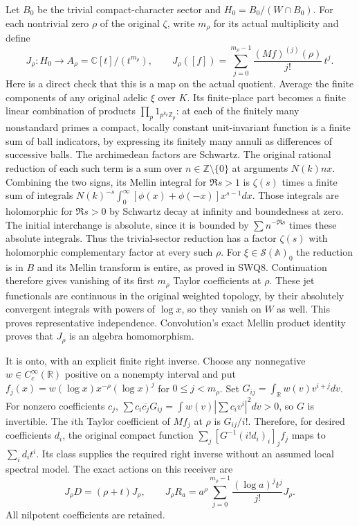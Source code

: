 Let $B_0$ be the trivial compact-character sector and
$H_0=B_0/(W\cap B_0)$. For each nontrivial zero $\rho$
of the original $\zeta$, write $m_\rho$ for its actual
multiplicity and define
\begin{equation}\tag{GDT11}
 J_\rho:H_0\longrightarrow
 A_\rho=\mathbb C[t]/(t^{m_\rho}),\qquad
 J_\rho([f])=\sum_{j=0}^{m_\rho-1}
       \frac{(Mf)^{(j)}(\rho)}{j!}\,t^j .
\end{equation}
Here is a direct check that this is a map on the actual
quotient. Average the finite components of any original
adelic $\xi$ over $K$. Its finite-place part becomes
a finite linear combination of products
$\prod_p1_{p^{k_p}\mathbb Z_p}$: at each of the finitely
many nonstandard primes a compact, locally constant
unit-invariant function is a finite sum of ball
indicators, by expressing its finitely many annuli
as differences of successive balls.
The archimedean factors are Schwartz.
The original rational reduction of each such term
is a sum over $n\in\mathbb Z\setminus\{0\}$ at
arguments $N(k)nx$. Combining the two signs, its Mellin
integral for $\Re s>1$ is $\zeta(s)$ times a finite sum
of integrals
$N(k)^{-s}\int_0^\infty[\phi(x)+\phi(-x)]x^{s-1}dx$.
Those integrals are holomorphic for $\Re s>0$ by
Schwartz decay at infinity and boundedness at zero.
The initial interchange is absolute, since it is
bounded by $\sum n^{-\Re s}$ times these absolute
integrals. Thus the trivial-sector reduction has a
factor $\zeta(s)$ with holomorphic complementary
factor at every such $\rho$.
For $\xi\in\mathcal S(\mathbb A)_0$ the reduction is in
$B$ and its Mellin transform is entire, as proved in
SWQ8. Continuation therefore gives vanishing of its
first $m_\rho$ Taylor coefficients at $\rho$.
These jet functionals are continuous in the original
weighted topology, by their absolutely convergent
integrals with powers of $\log x$, so they vanish
on $W$ as well. This proves representative independence.
Convolution's exact Mellin product identity proves
that $J_\rho$ is an algebra homomorphism.

It is onto, with an explicit finite right inverse.
Choose any nonnegative $w\in C_c^\infty(\mathbb R)$
positive on a nonempty interval and put
$f_j(x)=w(\log x)x^{-\rho}(\log x)^j$ for
$0\le j<m_\rho$.
Set $G_{ij}=\int_{\mathbb R}w(v)v^{i+j}dv$.
For nonzero coefficients $c_j$,
$\sum c_i\overline{c_j}G_{ij}
=\int w(v)|\sum c_iv^i|^2dv>0$,
so $G$ is invertible.
The $i$th Taylor coefficient of $Mf_j$ at $\rho$ is
$G_{ij}/i!$.
Therefore, for desired coefficients $d_i$, the original
compact function
$\sum_j[G^{-1}(i!d_i)_i]_jf_j$
maps to $\sum_i d_it^i$. Its class supplies the required
right inverse without an assumed local spectral model.
The exact actions on this receiver are
\begin{equation}\tag{GDT12}
 J_\rho D=(\rho+t)J_\rho,\qquad
 J_\rho R_a=a^\rho
   \sum_{j=0}^{m_\rho-1}\frac{(\log a)^j t^j}{j!}J_\rho.
\end{equation}
All nilpotent coefficients are retained.


